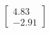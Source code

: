 \documentclass[preview]{standalone}
\begin{document}
\begin{align*}
\begin{bmatrix} 4.83 \\ -2.91 \end{bmatrix}
\end{align*}
\end{document}
